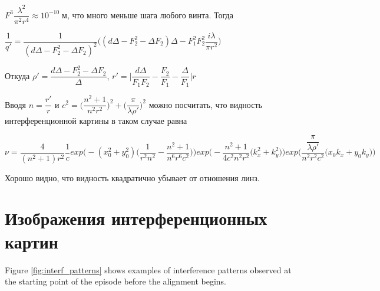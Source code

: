 $F^3 \dfrac{ \lambda^2}{\pi^2 r^4} \approx 10^{-10} \; м $, что много меньше шага любого винта. Тогда



$\dfrac{1}{q'}= \dfrac{1}{(d\Delta - F_{2}^2 -\Delta F_{2})^2} \Big((d\Delta - F_{2}^2 - \Delta F_{2})\Delta - F^{2}_{1}F^{2}_{2}\dfrac{i \lambda}{\pi r^2}\Big)$



Откуда $\rho ' =  \dfrac{d\Delta - F_{2}^2 - \Delta F_{2}}{\Delta}$, $r' = \Big |\dfrac{d\Delta}{F_{1}F_{2}} - \dfrac{F_{2}}{F_{1}} - \dfrac{\Delta}{F_{1}}\Big|r$




Вводя $n = \dfrac{r'}{r}$ и $c^2 = \Big(\dfrac{n^2 + 1}{n^2r^2}\Big) ^2 + \Big(\dfrac{\pi}{\lambda \rho '}\Big) ^2$ можно посчитать, что видность интерференционной картины в таком случае равна 



$\nu = \dfrac{4}{(n^2 + 1)r^2} \dfrac{1}{c} exp\Big(- (x_{0}^2 + y_{0}^2 ) \Big(\dfrac{1}{r^2n^2} - \dfrac{n^2 + 1}{n^6 r^6 c^2}\Big)\Big)  exp\Big( -\dfrac{n^2 + 1}{4 c^2 n^2 r^2}(k_{x}^2 + k_{y}^2\Big) \Big)exp\Big(  \dfrac{\dfrac{\pi}{\lambda \rho'}}{n^2 r^2 c^2}(x_{0}k_{x} + y_{0}k_{y}\Big)\Big)$


Хорошо видно, что видность квадратично убывает от отношения линз.

\chapter{Изображения интерференционных картин}\label{app:C}

Figure \ref{fig:interf_patterns} shows examples of interference patterns observed at the starting point of the episode before the alignment begins.


\clearpage

%
